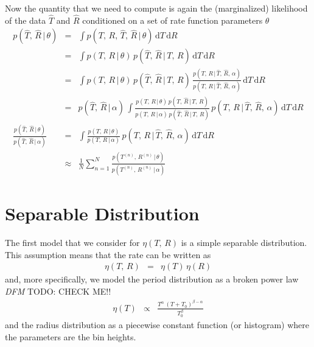 \documentclass[12pt,preprint]{aastex}
\newcommand{\dd}{\ensuremath{\,\mathrm{d}}}
\newcommand{\todo}[3]{{\color{#2} \emph{#1} TODO: #3}}
\newcommand{\dfmtodo}[1]{\todo{DFM}{red}{#1}}
\newcommand{\rate}{\ensuremath{\eta}}
\newcommand{\ratepars}{\ensuremath{\theta}}
\newcommand{\obs}[1]{\ensuremath{\hat{#1}}}
\newcommand{\radius}{\ensuremath{R}}
\newcommand{\period}{\ensuremath{T}}
\newcommand{\interim}{\ensuremath{\alpha}}
\begin{document}
Now the quantity that we need to compute is again the (marginalized)
likelihood of the data $\obs{\period}$ and $\obs{\radius}$ conditioned on a
set of rate function parameters \ratepars
\begin{eqnarray}
p(\obs{\period},\,\obs{\radius}\,|\,\ratepars) &=&
\int p(\period,\,\radius,\,\obs{\period},\,\obs{\radius}\,|\,\ratepars)
\dd\period\dd\radius \\
&=&
\int p(\period,\,\radius\,|\,\ratepars) \,
p(\obs{\period},\,\obs{\radius}\,|\,\period,\,\radius)
\dd\period\dd\radius \\
&=&
\int p(\period,\,\radius\,|\,\ratepars) \,
p(\obs{\period},\,\obs{\radius}\,|\,\period,\,\radius)\,
\frac{p(\period,\,\radius\,|\,\obs{\period},\,\obs{\radius},\,\interim)}
     {p(\period,\,\radius\,|\,\obs{\period},\,\obs{\radius},\,\interim)}
\dd\period\dd\radius \\
&=&
p(\obs{\period},\,\obs{\radius}\,|\,\interim)\,
\int
\frac{p(\period,\,\radius\,|\,\ratepars) \,
      p(\obs{\period},\,\obs{\radius}\,|\,\period,\,\radius)}
     {p(\period,\,\radius\,|\,\interim) \,
      p(\obs{\period},\,\obs{\radius}\,|\,\period,\,\radius)}\,
p(\period,\,\radius\,|\,\obs{\period},\,\obs{\radius},\,\interim)
\dd\period\dd\radius \\
\frac{p(\obs{\period},\,\obs{\radius}\,|\,\ratepars)}
     {p(\obs{\period},\,\obs{\radius}\,|\,\interim)}
&=&
\int
\frac{p(\period,\,\radius\,|\,\ratepars)}
     {p(\period,\,\radius\,|\,\interim)} \,
p(\period,\,\radius\,|\,\obs{\period},\,\obs{\radius},\,\interim)
\dd\period\dd\radius \\
&\approx&
\frac{1}{N}
\sum_{n=1}^N
\frac{p(\period^{(n)},\,\radius^{(n)}\,|\,\ratepars)}
     {p(\period^{(n)},\,\radius^{(n)}\,|\,\interim)}
\end{eqnarray}

\section{Separable Distribution}

The first model that we consider for $\rate(\period,\,\radius)$ is a simple
separable distribution.
This assumption means that the rate can be written as
\begin{eqnarray}
\rate(\period,\,\radius) &=& \rate(\period)\,\rate(\radius)
\end{eqnarray}
and, more specifically, we model the period distribution as a broken power law
\dfmtodo{CHECK ME!!}
\begin{eqnarray}
\rate(\period) &\propto& \frac{\period^\alpha \,
(\period+\period_0)^{\beta-\alpha}}{\period_0^\beta}
\end{eqnarray}
and the radius distribution as a piecewise constant function (or histogram)
where the parameters are the bin heights.
\end{document}
